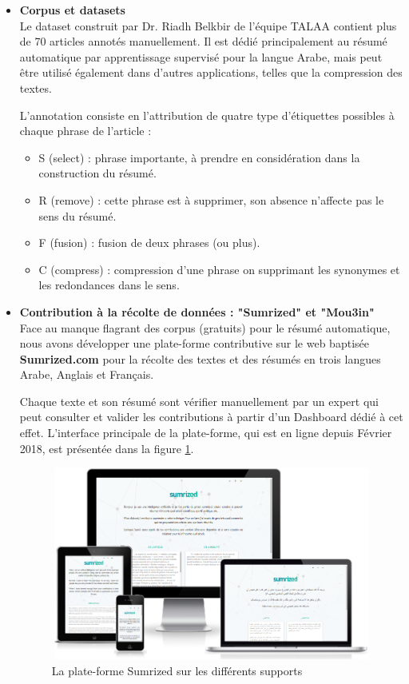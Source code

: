             \begin{itemize}[leftmargin=*]
                \item{\textbf{Corpus et datasets}}\\
                Le dataset construit par Dr. Riadh Belkbir de l'équipe TALAA contient plus de 70 articles annotés manuellement. Il est dédié principalement au résumé automatique par apprentissage supervisé pour la langue Arabe, mais peut être utilisé également dans d'autres applications, telles que la compression des textes.

                L'annotation consiste en l'attribution de quatre type d’étiquettes possibles à chaque phrase de l'article :
                \begin{itemize}
                    \item S (select) : phrase importante, à prendre en considération dans la construction du résumé.
                    \item R (remove) : cette phrase est à supprimer, son absence n'affecte pas le sens du résumé.
                    \item F (fusion) : fusion de deux phrases (ou plus).
                    \item C (compress) : compression d'une phrase on supprimant les synonymes et les redondances dans le sens.\\
                \end{itemize}
                \item{\textbf{Contribution à la récolte de données : "Sumrized" et "Mou3in"}}\\
                Face au manque flagrant des corpus (gratuits) pour le résumé automatique, nous avons développer une plate-forme contributive sur le web baptisée \textbf{Sumrized.com} pour la récolte des textes et des résumés en trois langues Arabe, Anglais et Français. 

                Chaque texte et son résumé sont vérifier manuellement par un expert qui peut consulter et valider les contributions à partir d'un Dashboard dédié à cet effet. L'interface principale de la plate-forme, qui est en ligne depuis Février 2018, est présentée dans la figure \ref{sumrized-ui}. 

                \begin{figure}[H]
                    \centering
                    \includegraphics[height=180pt,width=320pt]{img/chapter4/sumrized/responsive.png}
                    \caption{La plate-forme Sumrized sur les différents supports}
                    \label{sumrized-ui}
                \end{figure} 


\end{itemize}
